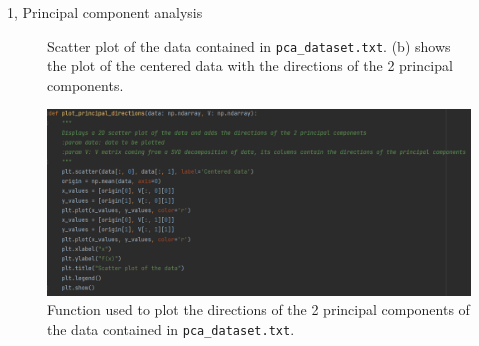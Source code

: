 \documentclass[10pt,a4paper]{article}
\begin{document}
\begin{task}{1, Principal component analysis}
\begin{figure}[H]
    \centering
    \hfill
    \caption{Scatter plot of the data contained in \texttt{pca\_dataset.txt}.
    (b) shows the plot of the centered data with the directions of the 2 principal components.}
    \label{fig:scatter-pca-data}
\end{figure}

\begin{figure}[H]
    \centering
    \includegraphics[scale=0.7]{images/plot_principal_components_directions.png}
    \caption{Function used to plot the directions of the 2 principal components of the data contained in \texttt{pca\_dataset.txt}.}
    \label{fig:plot-principal-components-directions}
\end{figure}


\end{task}
\end{document}
